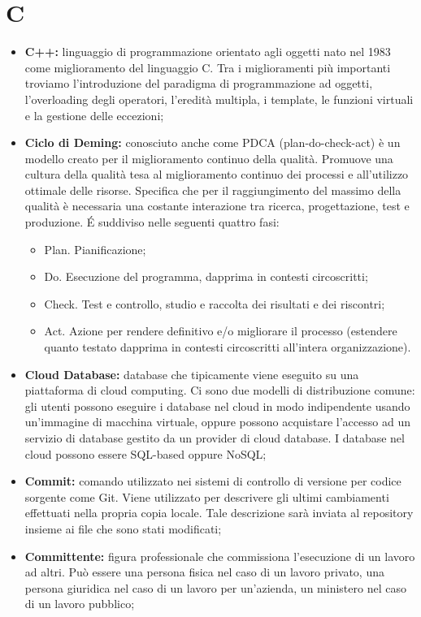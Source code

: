 \section*{C} %
\label{sec:c}
	\begin{itemize}
		\item \textbf{C++:} linguaggio di programmazione orientato agli oggetti nato nel 1983 come miglioramento del linguaggio C. Tra i miglioramenti più importanti troviamo l'introduzione del paradigma di programmazione ad oggetti, l'overloading degli operatori, l'eredità multipla, i template, le funzioni virtuali e la gestione delle eccezioni;
		\item \textbf{Ciclo di Deming:} conosciuto anche come PDCA (plan-do-check-act) è un modello creato per il miglioramento continuo della qualità. Promuove una cultura della qualità tesa al miglioramento continuo dei processi e all'utilizzo ottimale delle risorse. Specifica che per il raggiungimento del massimo della qualità è necessaria una costante interazione tra ricerca, progettazione, test e produzione. É suddiviso nelle seguenti quattro fasi:
			\begin{itemize}
				\item Plan. Pianificazione;
				\item Do. Esecuzione del programma, dapprima in contesti circoscritti;
				\item Check. Test e controllo, studio e raccolta dei risultati e dei riscontri;
				\item Act. Azione per rendere definitivo e/o migliorare il processo (estendere quanto testato dapprima in contesti circoscritti all'intera organizzazione).
			\end{itemize}
		\item \textbf{Cloud Database:} database che tipicamente viene eseguito su una piattaforma di cloud computing. Ci sono due modelli di distribuzione comune: gli utenti possono eseguire i database nel cloud in modo indipendente usando un'immagine di macchina virtuale, oppure possono acquistare l'accesso ad un servizio di database gestito da un provider di cloud database. I database nel cloud possono essere SQL-based oppure NoSQL;
		\item \textbf{Commit:} comando utilizzato nei sistemi di controllo di versione per codice sorgente come Git. Viene utilizzato per descrivere gli ultimi cambiamenti effettuati nella propria copia locale. Tale descrizione sarà inviata al repository insieme ai file che sono stati modificati;
		\item \textbf{Committente:} figura professionale che commissiona l'esecuzione di un lavoro ad altri. Può essere una persona fisica nel caso di un lavoro privato, una persona giuridica nel caso di un lavoro per un'azienda, un ministero nel caso di un lavoro pubblico;

\end{itemize}
